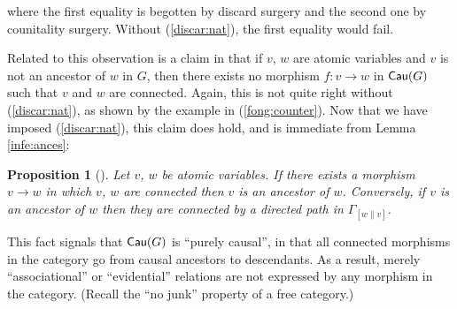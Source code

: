 \documentclass[12pt]{amsart}
\theoremstyle{plain}
\newtheorem{prop}[thm]{Proposition}
\theoremstyle{definition}
\theoremstyle{remark}
\numberwithin{equation}{section}
\theoremstyle{plain}
\newcommand{\0}{\emptyset}
\newcommand{\fun}{\longrightarrow}
\newcommand{\cat}[1]{\textup{\textsf{#1}}}
\DeclareMathOperator{\cau}{\sf{Cau}}
\newcommand{\stri}{\Gamma}
\begin{document}
where the first equality is begotten by discard surgery  and the second one by counitality surgery. Without (\ref{discar:nat}), the first equality would fail.

Related to this observation is a claim in \cite[Proposition~4.2]{Fong:thesis} that if $v$, $w$ are atomic variables and $v$ is not an ancestor of $w$ in $G$, then there exists no morphism $f: v \fun w$ in $\cat{Cau}(G)$ such that $v$ and $w$ are connected. Again, this is not quite right without (\ref{discar:nat}), as shown by the example in (\ref{fong:counter}). Now that we have imposed (\ref{discar:nat}), this claim does hold, and is immediate from Lemma \ref{infe:ances}:

\begin{prop}[\cite{Fong:thesis}]
\label{connect:ancestral}
Let $v$, $w$ be atomic variables. If there exists a morphism $v \fun w$ in which $v$, $w$ are connected then $v$ is an ancestor of $w$. Conversely, if $v$ is an ancestor of $w$ then they are connected by a directed path in $\stri_{[w \| v]}$.
\end{prop}


This fact signals that $\cau(G)$ is ``purely causal'', in that all connected morphisms in the category go from causal ancestors to descendants. As a result, merely ``associational'' or ``evidential'' relations are not expressed by any morphism in the category. (Recall the ``no junk'' property of a free category.)
\end{document}
